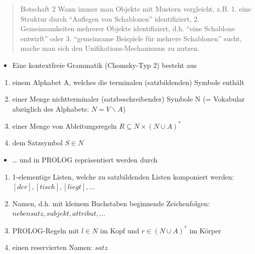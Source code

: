 \documentclass[a4paper]{article}
\begin{document}
\begin{multicols}{3}
  \begin{quote}
    Botschaft 2 Wann immer man Objekte mit Mustern vergleicht, z.B. 1. eine
    Struktur durch ``Auflegen von Schablonen'' identifiziert, 2.
    Gemeinsamkeiten mehrerer Objekte identifiziert, d.h. ``eine Schablone
    entwirft'' oder 3. ``gemeinsame Beispiele für mehrere Schablonen''
    sucht, mache man sich den Unifikations-Mechanismus zu nutzen.
  \end{quote}

  \begin{itemize}
    \itemsep1pt\parskip0pt
    \item
          Eine kontextfreie Grammatik (Chomsky-Typ 2) besteht aus
  \end{itemize}

  \begin{enumerate}
    \itemsep1pt\parskip0pt
    \item
          einem Alphabet A, welches die terminalen (satzbildenden) Symbole
          enthält
    \item
          einer Menge nichtterminaler (satzbeschreibender) Symbole N (=
          Vokabular abzüglich des Alphabets: $N = V \backslash A$)
    \item
          einer Menge von Ableitungsregeln $R\subseteq N\times (N\cup A)^*$
    \item
          dem Satzsymbol $S\in N$
  \end{enumerate}

  \begin{itemize}
    \itemsep1pt\parskip0pt
    \item
          \ldots{} und in PROLOG repräsentiert werden durch
  \end{itemize}

  \begin{enumerate}
    \itemsep1pt\parskip0pt
    \item
          1-elementige Listen, welche zu satzbildenden Listen komponiert werden:
          $[der],[tisch],[liegt],...$
    \item
          Namen, d.h. mit kleinem Buchstaben beginnende Zeichenfolgen:
          $nebensatz,subjekt,attribut,...$
    \item
          PROLOG-Regeln mit $l\in N$ im Kopf und $r\in(N\cup A)^*$ im Körper
    \item
          einen reservierten Namen: $satz$
  \end{enumerate}


\end{multicols}
\end{document}
